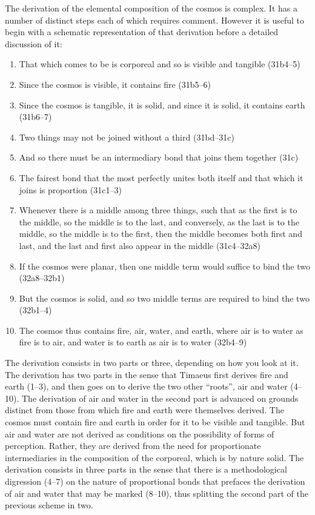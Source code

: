 The derivation of the elemental composition of the cosmos is complex. It has a number of distinct steps each of which requires comment. However it is useful to begin with a schematic representation of that derivation before a detailed discussion of it:
\begin{enumerate}[(1)]
	\item That which comes to be is corporeal and so is visible and tangible (31b4--5)
	\item Since the cosmos is visible, it contains fire (31b5--6)
	\item Since the cosmos is tangible, it is solid, and since it is solid, it contains earth (31b6--7)
	\item Two things may not be joined without a third (31bd--31c)
	\item And so there must be an intermediary bond that joins them together (31c)
	\item The fairest bond that the most perfectly unites both itself and that which it joins is proportion (31c1--3)
	\item Whenever there is a middle among three things, such that as the first is to the middle, so the middle is to the last, and conversely, as the last is to the middle, so the middle is to the first, then the middle becomes both first and last, and the last and first also appear in the middle (31c4--32a8)
	\item If the cosmos were planar, then one middle term would suffice to bind the two (32a8--32b1)
	\item But the cosmos is solid, and so two middle terms are required to bind the two (32b1--4)
	\item The cosmos thus contains fire, air, water, and earth, where air is to water as fire is to air, and water is to earth as air is to water (32b4--9)
\end{enumerate}
The derivation consists in two parts or three, depending on how you look at it. The derivation has two parts in the sense that Timaeus first derives fire and earth (1--3), and then goes on to derive the two other ``roots'', air and water (4--10). The derivation of air and water in the second part is advanced on grounds distinct from those from which fire and earth were themselves derived. The cosmos must contain fire and earth in order for it to be visible and tangible. But air and water are not derived as conditions on the possibility of forms of perception. Rather, they are derived from the need for proportionate intermediaries in the composition of the corporeal, which is by nature solid. The derivation consists in three parts in the sense that there is a methodological digression (4--7) on the nature of proportional bonds that prefaces the derivation of air and water that may be marked (8--10), thus splitting the second part of the previous scheme in two.


